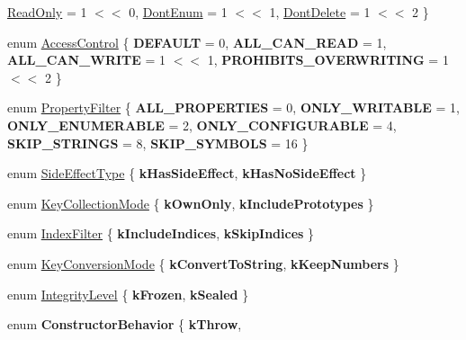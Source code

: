 \begin{DoxyCompactItemize}
\mbox{\hyperlink{namespacev8_a05f25f935e108a1ea2d150e274602b87ae573d0077ef51499dfd8cb937c1fb9c3}{Read\+Only}} = 1 $<$$<$ 0, 
\mbox{\hyperlink{namespacev8_a05f25f935e108a1ea2d150e274602b87a471522265c2efddb22a61f2d6db2df9a}{Dont\+Enum}} = 1 $<$$<$ 1, 
\mbox{\hyperlink{namespacev8_a05f25f935e108a1ea2d150e274602b87a82a2064c866b0237d3904d30942531c6}{Dont\+Delete}} = 1 $<$$<$ 2
 \}
\item 
enum \mbox{\hyperlink{namespacev8_a31d8355cb043d7d2dda3f4a52760b64e}{Access\+Control}} \{ {\bfseries D\+E\+F\+A\+U\+LT} = 0, 
{\bfseries A\+L\+L\+\_\+\+C\+A\+N\+\_\+\+R\+E\+AD} = 1, 
{\bfseries A\+L\+L\+\_\+\+C\+A\+N\+\_\+\+W\+R\+I\+TE} = 1 $<$$<$ 1, 
{\bfseries P\+R\+O\+H\+I\+B\+I\+T\+S\+\_\+\+O\+V\+E\+R\+W\+R\+I\+T\+I\+NG} = 1 $<$$<$ 2
 \}
\item 
enum \mbox{\hyperlink{namespacev8_afbf02b6b1152a3e25d7bde90798209ac}{Property\+Filter}} \{ \newline
{\bfseries A\+L\+L\+\_\+\+P\+R\+O\+P\+E\+R\+T\+I\+ES} = 0, 
{\bfseries O\+N\+L\+Y\+\_\+\+W\+R\+I\+T\+A\+B\+LE} = 1, 
{\bfseries O\+N\+L\+Y\+\_\+\+E\+N\+U\+M\+E\+R\+A\+B\+LE} = 2, 
{\bfseries O\+N\+L\+Y\+\_\+\+C\+O\+N\+F\+I\+G\+U\+R\+A\+B\+LE} = 4, 
\newline
{\bfseries S\+K\+I\+P\+\_\+\+S\+T\+R\+I\+N\+GS} = 8, 
{\bfseries S\+K\+I\+P\+\_\+\+S\+Y\+M\+B\+O\+LS} = 16
 \}
\item 
enum \mbox{\hyperlink{namespacev8_a29711319c2b9fc7716d65faee2f7b9cb}{Side\+Effect\+Type}} \{ {\bfseries k\+Has\+Side\+Effect}, 
{\bfseries k\+Has\+No\+Side\+Effect}
 \}
\item 
enum \mbox{\hyperlink{namespacev8_a0cee20f5c7f0d59d0835af8e537388dc}{Key\+Collection\+Mode}} \{ {\bfseries k\+Own\+Only}, 
{\bfseries k\+Include\+Prototypes}
 \}
\item 
enum \mbox{\hyperlink{namespacev8_a46fd71fef702b35b34ed7495e7a63323}{Index\+Filter}} \{ {\bfseries k\+Include\+Indices}, 
{\bfseries k\+Skip\+Indices}
 \}
\item 
enum \mbox{\hyperlink{namespacev8_aa65aeff871614520d8033dead4b34e38}{Key\+Conversion\+Mode}} \{ {\bfseries k\+Convert\+To\+String}, 
{\bfseries k\+Keep\+Numbers}
 \}
\item 
enum \mbox{\hyperlink{namespacev8_a02642d03ff1eecc2fd358626499c2e30}{Integrity\+Level}} \{ {\bfseries k\+Frozen}, 
{\bfseries k\+Sealed}
 \}
\item 
\mbox{\label{namespacev8_a74b1ae9fa47d627267888db81a335ecc}} 
enum {\bfseries Constructor\+Behavior} \{ {\bfseries k\+Throw}, 
$$
\end{DoxyCompactItemize}
